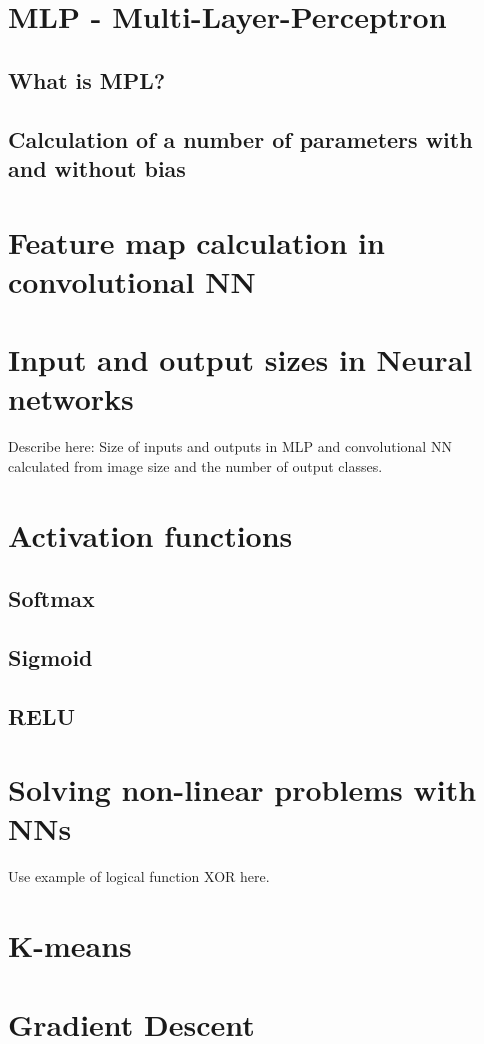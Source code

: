 \section{MLP - Multi-Layer-Perceptron}
\subsection{What is MPL?}
\subsection{Calculation of a number of parameters with and without bias}

\section{Feature map calculation in convolutional NN}

\section{Input and output sizes in Neural networks}
Describe here: Size of inputs and outputs in MLP and convolutional NN calculated from image size and the number of output classes.

\section{Activation functions}
\subsection{Softmax}
\subsection{Sigmoid}
\subsection{RELU}

\section{Solving non-linear problems with NNs}
Use example of logical function XOR here.

\section{K-means}

\section{Gradient Descent}

